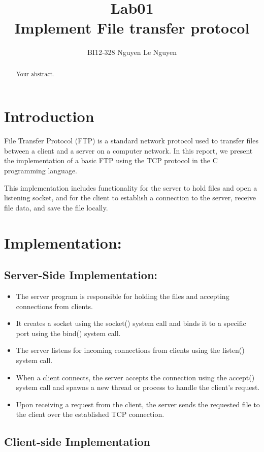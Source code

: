 \documentclass{article}
\title{Lab01 \\ Implement File transfer protocol }
\author{BI12-328 Nguyen Le Nguyen}
\begin{document}
\maketitle

\begin{abstract}
Your abstract.
\end{abstract}

\section{Introduction}

File Transfer Protocol (FTP) is a standard network protocol used to transfer files between a client and a server on a computer network. In this report, we present the implementation of a basic FTP using the TCP protocol in the C programming language. 

This implementation includes functionality for the server to hold files and open a listening socket, and for the client to establish a connection to the server, receive file data, and save the file locally.

\section{Implementation:}

\subsection{Server-Side Implementation:}

\begin{itemize}
  \item The server program is responsible for holding the files and accepting connections from clients.
  \item It creates a socket using the socket() system call and binds it to a specific port using the bind() system call.
  \item The server listens for incoming connections from clients using the listen() system call.
  \item When a client connects, the server accepts the connection using the accept() system call and spawns a new thread or process to handle the client's request.
  \item Upon receiving a request from the client, the server sends the requested file to the client over the established TCP connection.
\end{itemize}

\subsection{Client-side Implementation}
\end{document}
